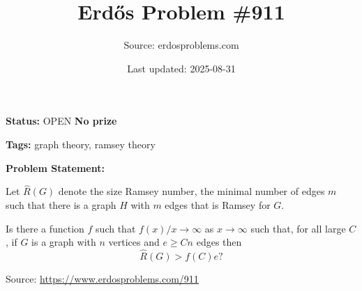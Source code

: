 \documentclass{article}
\title{Erd\H{o}s Problem \#911}
\date{Last updated: 2025-08-31}
\author{Source: erdosproblems.com}
\begin{document}
\maketitle

\noindent\textbf{Status:} OPEN \quad \textbf{No prize}

\noindent\textbf{Tags:} graph theory, ramsey theory

\medskip
\noindent\textbf{Problem Statement:}

Let $\hat{R}(G)$ denote the size Ramsey number, the minimal number of edges $m$ such that there is a graph $H$ with $m$ edges that is Ramsey for $G$.

Is there a function $f$ such that $f(x)/x\to \infty$ as $x\to \infty$ such that, for all large $C$, if $G$ is a graph with $n$ vertices and $e\geq Cn$ edges then\[\hat{R}(G) > f(C) e?\]

\bigskip
\noindent\small{Source: \url{https://www.erdosproblems.com/911}}
\end{document}
